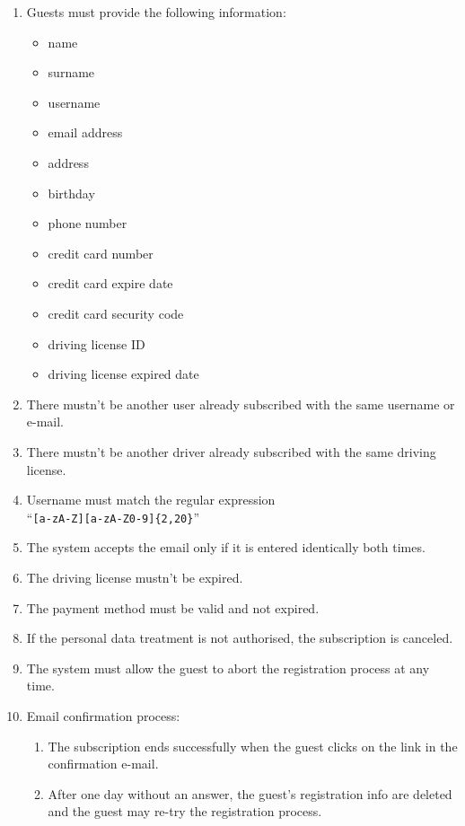 \begin{enumerate}
	\item Guests must provide the following information:
	\begin{itemize}
		\item name
		\item surname
		\item username
		\item email address
		\item address
		\item birthday
		\item phone number
		\item credit card number
		\item credit card expire date
		\item credit card security code
		\item driving license ID
		\item driving license expired date	
	\end{itemize}
	\item There mustn't be another user already subscribed with the same username or e-mail. \label{f-sameinfo}
	\item There mustn't be another driver already subscribed with the same driving license. \label{f-samelicense}	
	\item Username must match the regular expression\\``\texttt{[a-zA-Z][a-zA-Z0-9]\{2,20\}}''    \label{f-usrn}
	\item The system accepts the email only if it is entered identically both times.\label{f-wrongmail}
	\item The driving license mustn't be expired.
	\label{f-licenseexp}
	\item The payment method must be valid and not expired.
	\label{f-cc}
	\item If the personal data treatment is not authorised, the subscription is canceled. \label{f-dataTreat}
	\item The system must allow the guest to abort the registration process at any time.
	\item Email confirmation process:
	\begin{enumerate}
		\item The subscription ends successfully when the guest clicks on the link in the confirmation e-mail.
		\item After one day without an answer, the guest's registration info are deleted and the guest may re-try the registration process.  \label{f-confirm}
	\end{enumerate}
\end{enumerate}

